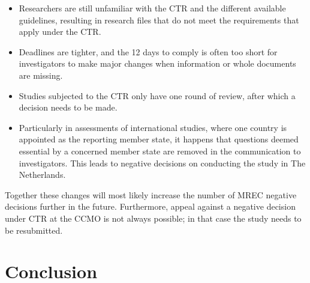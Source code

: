 \documentclass[authordate, meta, issue]{jote-new-article}
\begin{document}
\begin{itemize}


  \item Researchers are still unfamiliar with the CTR and the different available guidelines, resulting in research files that do not meet the requirements that apply under the CTR.



  \item
        Deadlines are tighter, and the 12 days to comply is often too short for investigators to make major changes when information or whole documents are missing.



  \item Studies subjected to the CTR only have one round of review, after which a decision needs to be made.



  \item
        Particularly in assessments of international studies, where one country is appointed as the reporting member state, it happens that questions deemed essential by a concerned member state are removed in the communication to investigators. This leads to negative decisions on conducting the study in The Netherlands.


\end{itemize}
\newpage
Together these changes will most likely increase the number of MREC negative decisions further in the future. Furthermore, appeal against a negative decision under CTR at the CCMO is not always possible; in that case the study needs to be resubmitted.







\section{Conclusion}
\end{document}
